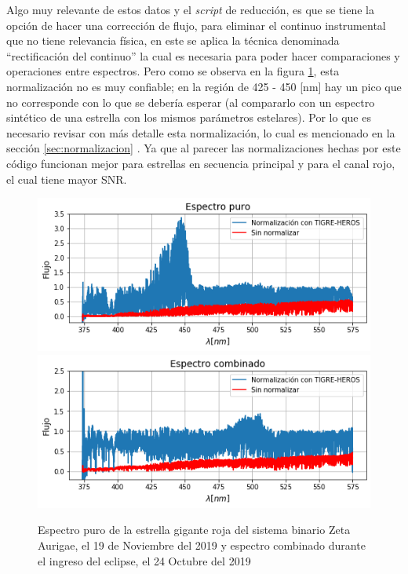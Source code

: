 \documentclass[12pt,oneside,openany,letter]{book}
\begin{document}
\noindent Algo muy relevante de estos datos y el \textit{script} de reducción, es que se tiene la opción de hacer una corrección de flujo, para eliminar el continuo instrumental que no tiene relevancia física, en este se aplica la técnica denominada “rectificación del continuo” la cual es necesaria para poder hacer comparaciones y operaciones entre espectros. Pero como se observa en la figura \ref{fig:espectro_puro}, esta normalización no es muy confiable; en la región de 425 - 450 [nm] hay un pico que no corresponde con lo que se debería esperar (al compararlo con un espectro sintético de una estrella con los mismos parámetros estelares). Por lo que es necesario revisar con más detalle esta normalización, lo cual es mencionado en la sección \ref{sec:normalizacion} . Ya que al parecer las normalizaciones hechas por este código funcionan mejor para estrellas en secuencia principal y para el canal rojo, el cual tiene mayor SNR.

\begin{figure}
    \centering
    \includegraphics[width=0.9\linewidth]{Images/espectro_puro.png}
    \includegraphics[width=0.9\linewidth]{Gaficas/espectro_combinado.png}
    \caption{Espectro puro de la estrella gigante roja del sistema binario Zeta Aurigae, el 19 de Noviembre del 2019 y espectro combinado durante el ingreso del eclipse, el 24 Octubre del 2019}
    \label{fig:espectro_puro}
\end{figure}
\end{document}
